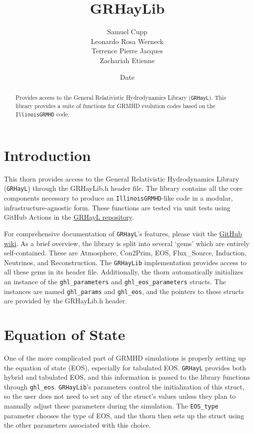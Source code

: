 \documentclass{article}
\newcommand{\grhayl}{\texttt{GRHayL}\xspace}
\newcommand{\glib}{\texttt{GRHayLib}\xspace}
\newcommand{\igm}{\texttt{IllinoisGRMHD}\xspace}
\begin{document}
\title{GRHayLib}
\author{Samuel Cupp \\ Leonardo Rosa Werneck \\ Terrence Pierre Jacques \\ Zachariah Etienne}
\date{$ $Date$ $}

\maketitle


\begin{abstract}
Provides access to the General Relativistic Hydrodynamics
Library (\grhayl). This library provides a suite of functions
for GRMHD evolution codes based on the \igm code.
\end{abstract}

\section{Introduction}

This thorn provides access to the General Relativistic
Hydrodynamics Library (\grhayl) through the GRHayLib.h
header file. The library contains all the core components
necessary to produce an \igm-like code in a modular,
infrastructure-agnostic form. These functions are tested
via unit tests using GitHub Actions in the
\href{https://github.com/GRHayL/GRHayL}{GRHayL repository}.

For comprehensive documentation of \grhayl's features, please
visit the \href{https://github.com/GRHayL/GRHayL/wiki}{GitHub wiki}.
As a brief overview, the library is split into several `gems'
which are entirely self-contained. These are Atmosphere, Con2Prim,
EOS, Flux\_Source, Induction, Neutrinos, and Reconstruction.
The \glib implementation provides access to all these gems in its
header file. Additionally, the thorn automatically initializes an
instance of the \texttt{ghl\_parameters} and \texttt{ghl\_eos\_parameters}
structs. The instances are named \texttt{ghl\_params} and \texttt{ghl\_eos},
and the pointers to these structs are provided by the GRHayLib.h
header.

\section{Equation of State}

One of the more complicated part of GRMHD simulations is properly
setting up the equation of state (EOS), especially for tabulated EOS.
\grhayl provides both hybrid and tabulated EOS, and this information
is passed to the library functions through \texttt{ghl\_eos}. \glib's
parameters control the initialization of this struct, so the user does
not need to set any of the struct's values unless they plan to manually
adjust these parameters during the simulation. The \texttt{EOS\_type}
parameter chooses the type of EOS, and the thorn then sets up the struct
using the other parameters associated with this choice.
\end{document}

